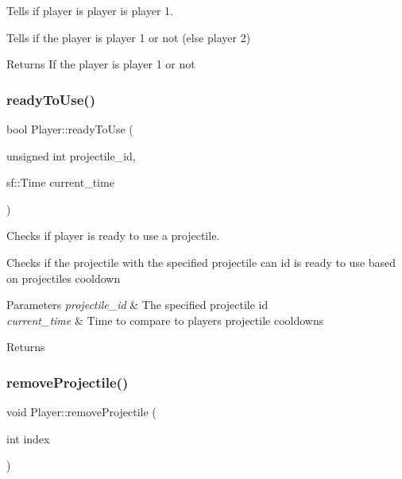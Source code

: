 Tells if player is player is player 1. 

Tells if the player is player 1 or not (else player 2) \begin{DoxyReturn}{Returns}
If the player is player 1 or not 
\end{DoxyReturn}
\mbox{\label{classPlayer_a1f5b4b98f1fa5fd8508cc2172f671b36}} 
\subsubsection{\texorpdfstring{ready\+To\+Use()}{readyToUse()}}
{\footnotesize\ttfamily bool Player\+::ready\+To\+Use (\begin{DoxyParamCaption}\item[{unsigned int}]{projectile\+\_\+id,  }\item[{sf\+::\+Time}]{current\+\_\+time }\end{DoxyParamCaption})}



Checks if player is ready to use a projectile. 

Checks if the projectile with the specified projectile can id is ready to use based on projectiles cooldown 
\begin{DoxyParams}{Parameters}
{\em projectile\+\_\+id} & The specified projectile id \\
\hline
{\em current\+\_\+time} & Time to compare to player\textquotesingle{}s projectile cooldowns \\
\hline
\end{DoxyParams}
\begin{DoxyReturn}{Returns}

\end{DoxyReturn}
\mbox{\label{classPlayer_a5fd87607be56c5175539f4e30ab09923}} 
\subsubsection{\texorpdfstring{remove\+Projectile()}{removeProjectile()}}
{\footnotesize\ttfamily void Player\+::remove\+Projectile (\begin{DoxyParamCaption}\item[{int}]{index }\end{DoxyParamCaption})}



